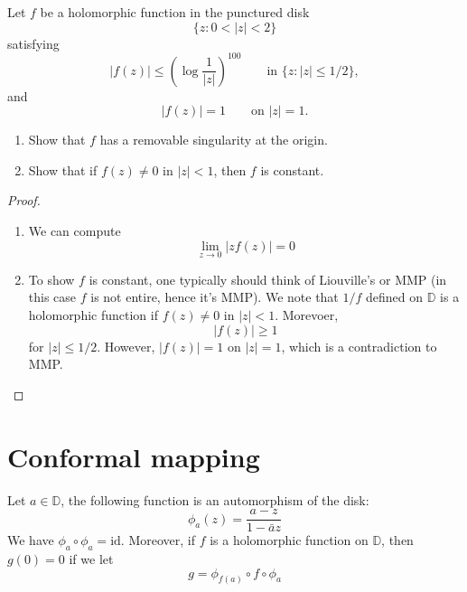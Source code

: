 \documentclass[openany]{book}
\newcommand{\D}{\mathbb{D}}
\begin{document}
\begin{prob}[Fall 2019, Q4]
    Let $f$ be a holomorphic function in the punctured disk
    \[
    \{z:0<|z|<2\}
    \]
    satisfying
    \[
    |f(z)|\leq
    \left(\log\frac{1}{|z|}\right)^{100}
    \qquad\text{in } \{z:|z|\leq 1/2\},
    \]
    and
    \[
    |f(z)|=1 \qquad\text{on } |z|=1.
    \]
    
    \begin{enumerate}
        \item[(a)] Show that $f$ has a removable singularity at the origin.
    
        \item[(b)] Show that if $f(z)\neq 0$ in $|z|<1$, then $f$ is constant.
    \end{enumerate}
\end{prob}
\begin{proof}
        \begin{enumerate}
            \item[(a)] We can compute 
            \begin{equation*}
                \lim_{z\to 0}|zf(z)|=0
            \end{equation*}
            \item[(b)] To show $f$ is constant, one typically should think of Liouville's or MMP (in this case $f$ is not entire, hence it's MMP). We note that $1/f$ defined on $\D$ is a holomorphic function if $f(z)\neq 0$ in $|z|<1$. Morevoer, 
            \begin{equation*}
                |f(z)|\geq 1
            \end{equation*}
            for $|z|\leq 1/2$. However, $|f(z)|=1$ on $|z|=1$, which is a contradiction to MMP.
        \end{enumerate}
\end{proof}




\chapter{Conformal mapping}

\begin{defn}
    Let $a\in\mathbb{D}$, the following function is an automorphism of the disk:
    \begin{equation*}
        \phi_a(z)=\frac{a-z}{1-\bar{a}z}
    \end{equation*}
    We have $\phi_{a}\circ\phi_{a}=\text{id}$. Moreover, if $f$ is a holomorphic function on $\mathbb{D}$, then $g(0)=0$ if we let
    \begin{equation*}
        g=\phi_{f(a)}\circ f\circ\phi_{a}
    \end{equation*}
\end{defn}
\end{document}

